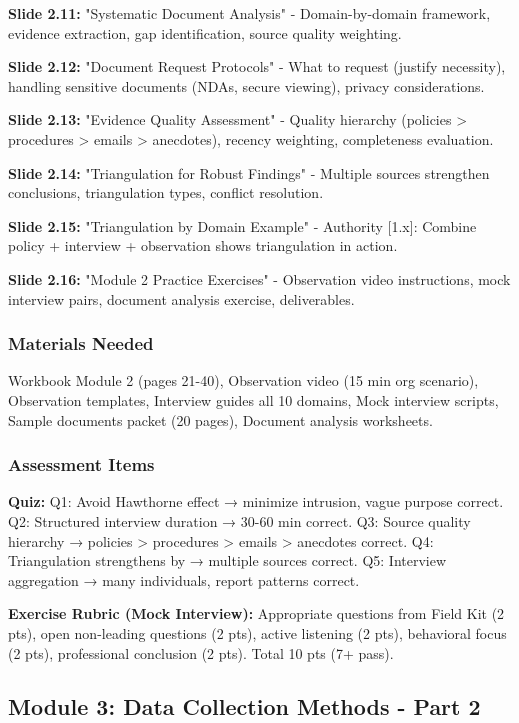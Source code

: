 \documentclass[11pt,a4paper]{article}
\begin{document}
\textbf{Slide 2.11:} "Systematic Document Analysis" - Domain-by-domain framework, evidence extraction, gap identification, source quality weighting.

\textbf{Slide 2.12:} "Document Request Protocols" - What to request (justify necessity), handling sensitive documents (NDAs, secure viewing), privacy considerations.

\textbf{Slide 2.13:} "Evidence Quality Assessment" - Quality hierarchy (policies > procedures > emails > anecdotes), recency weighting, completeness evaluation.

\textbf{Slide 2.14:} "Triangulation for Robust Findings" - Multiple sources strengthen conclusions, triangulation types, conflict resolution.

\textbf{Slide 2.15:} "Triangulation by Domain Example" - Authority [1.x]: Combine policy + interview + observation shows triangulation in action.

\textbf{Slide 2.16:} "Module 2 Practice Exercises" - Observation video instructions, mock interview pairs, document analysis exercise, deliverables.

\subsubsection{Materials Needed}

Workbook Module 2 (pages 21-40), Observation video (15 min org scenario), Observation templates, Interview guides all 10 domains, Mock interview scripts, Sample documents packet (20 pages), Document analysis worksheets.

\subsubsection{Assessment Items}

\textbf{Quiz:} Q1: Avoid Hawthorne effect → minimize intrusion, vague purpose correct. Q2: Structured interview duration → 30-60 min correct. Q3: Source quality hierarchy → policies > procedures > emails > anecdotes correct. Q4: Triangulation strengthens by → multiple sources correct. Q5: Interview aggregation → many individuals, report patterns correct.

\textbf{Exercise Rubric (Mock Interview):} Appropriate questions from Field Kit (2 pts), open non-leading questions (2 pts), active listening (2 pts), behavioral focus (2 pts), professional conclusion (2 pts). Total 10 pts (7+ pass).

\subsection{Module 3: Data Collection Methods - Part 2}
\end{document}
